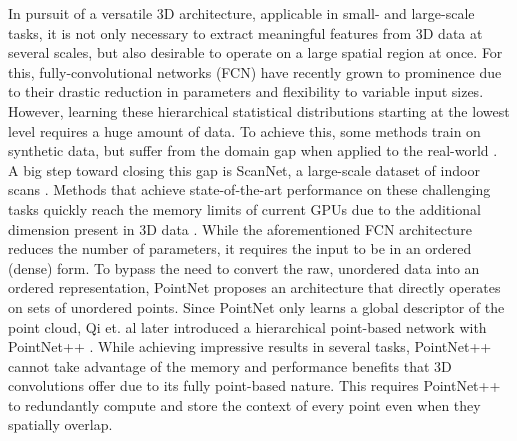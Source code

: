 \documentclass[runningheads]{llncs}
\begin{document}

In pursuit of a versatile 3D architecture, applicable in small- and large-scale tasks, it is not only necessary to extract meaningful features from 3D data at several scales, but also desirable to operate on a large spatial region at once. For this, fully-convolutional networks (FCN) \cite{Shelhamer2016} have recently grown to prominence due to their drastic reduction in parameters and flexibility to variable input sizes. However, learning these hierarchical statistical distributions starting at the lowest level requires a huge amount of data. To achieve this, some methods train on synthetic data, but suffer from the domain gap when applied to the real-world \cite{Song2016}. A big step toward closing this gap is ScanNet, a large-scale dataset of indoor scans \cite{Dai2017}. Methods that achieve state-of-the-art performance on these challenging tasks quickly reach the memory limits of current GPUs due to the additional dimension present in 3D data \cite{Klokov2017,Riegler2017}. While the aforementioned FCN architecture reduces the number of parameters, it requires the input to be in an ordered (dense) form. To bypass the need to convert the raw, unordered data into an ordered representation, PointNet \cite{Qi2017} proposes an architecture that directly operates on sets of unordered points. Since PointNet only learns a global descriptor of the point cloud, Qi et. al later introduced a hierarchical point-based network with PointNet++ \cite{Qi2017_2}. While achieving impressive results in several tasks, PointNet++ cannot take advantage of the memory and performance benefits that 3D convolutions offer due to its fully point-based nature. This requires PointNet++ to redundantly compute and store the context of every point even when they spatially overlap.\\
\end{document}
